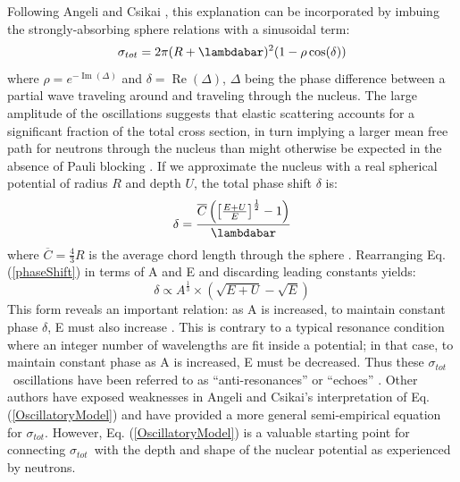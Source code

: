 \documentclass[twocolumn,secnumarabic,amssymb, nobibnotes, aps, prl,
superscriptaddress, nobalancelastpage]{revtex4}
\newcommand{\tot}{\ensuremath{\sigma_{tot}}}
\begin{document}
Following Angeli and Csikai \cite{Angeli1970}, this explanation can be
incorporated by imbuing the strongly-absorbing sphere relations
with a sinusoidal term:
\begin{equation} \label{OscillatoryModel}
    \tot = 2\pi (R+\lambdabar)^{2}(1 - \rho \cos(\delta))
\end{equation}
where $\rho = e^{-\operatorname{Im}(\Delta)}$ and $\delta =
\operatorname{Re}(\Delta)$, $\Delta$ being the phase difference between a
partial wave traveling
around and traveling through the nucleus. The large amplitude of the
oscillations suggests that elastic scattering accounts for a
significant fraction of the total cross section, in turn implying a 
larger mean free path for neutrons through the nucleus 
than might otherwise be expected in the absence of Pauli blocking
\cite{Mohr1955, Feshbach1958}.
If we approximate the nucleus with a
real spherical potential of radius $R$ and depth $U$, the total phase shift $\delta$ is:
\begin{equation} \label{phaseShift}
    \delta =
    \frac{\overline{C}\left(\left[{\frac{E+U}{E}}\right]^{\frac{1}{2}}-1\right)}{\lambdabar}
\end{equation}
where $\overline{C} = \frac{4}{3}R$ is the average chord length through the
sphere \cite{Angeli1970}. Rearranging Eq. (\ref{phaseShift}) in terms of A and E and
discarding leading constants yields:
\begin{equation}
    \delta \propto A^{\frac{1}{3}}\times\left(\sqrt{E+U}-\sqrt{E}\right)
\end{equation}
This form reveals an important relation: as A is increased, to maintain constant 
phase $\delta$, E must also increase \cite{Satchler1980, Peterson1962}. 
This is contrary to a typical resonance condition where an integer number of wavelengths
are fit inside a potential; in that case, to maintain constant phase as A is increased,
E must be decreased. Thus these \tot\ oscillations have been referred to as
``anti-resonances'' or ``echoes'' \cite{Satchler1980, McVoy1967}.
Other authors \cite{Ahmad1973} have
exposed weaknesses in Angeli and Csikai's interpretation of
Eq. (\ref{OscillatoryModel}) and have provided a more general semi-empirical
equation for \tot. However, Eq. (\ref{OscillatoryModel}) is a valuable starting
point for connecting \tot\ with the depth and shape of the nuclear
potential as experienced by neutrons.
\end{document}
